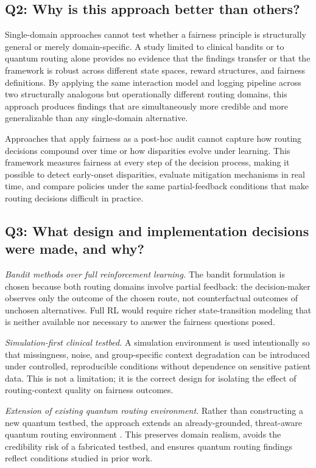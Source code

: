 \documentclass{IEEEtran}
\begin{document}
\subsection{Q2: Why is this approach better than others?}
Single-domain approaches cannot test whether a fairness principle is
structurally general or merely domain-specific. A study limited to clinical
bandits or to quantum routing alone provides no evidence that the findings
transfer or that the framework is robust across different state spaces,
reward structures, and fairness definitions. By applying the same interaction
model and logging pipeline across two structurally analogous but operationally
different routing domains, this approach produces findings that are
simultaneously more credible and more generalizable than any single-domain
alternative.

Approaches that apply fairness as a post-hoc audit cannot capture how
routing decisions compound over time or how disparities evolve under
learning. This framework measures fairness at every step of the decision
process, making it possible to detect early-onset disparities, evaluate
mitigation mechanisms in real time, and compare policies under the same
partial-feedback conditions that make routing decisions difficult in practice.

\subsection{Q3: What design and implementation decisions were made, and why?}
\textit{Bandit methods over full reinforcement learning.} The bandit
formulation is chosen because both routing domains involve partial feedback:
the decision-maker observes only the outcome of the chosen route, not
counterfactual outcomes of unchosen alternatives. Full RL would require
richer state-transition modeling that is neither available nor necessary to
answer the fairness questions posed.

\textit{Simulation-first clinical testbed.} A simulation environment is used
intentionally so that missingness, noise, and group-specific context
degradation can be introduced under controlled, reproducible conditions
without dependence on sensitive patient data. This is not a limitation; it
is the correct design for isolating the effect of routing-context quality on
fairness outcomes.

\textit{Extension of existing quantum routing environment.} Rather than
constructing a new quantum testbed, the approach extends an already-grounded,
threat-aware quantum routing environment
\cite{garcia2026threat_aware_quantum_routing}. This preserves domain
realism, avoids the credibility risk of a fabricated testbed, and ensures
quantum routing findings reflect conditions studied in prior work.
\end{document}
